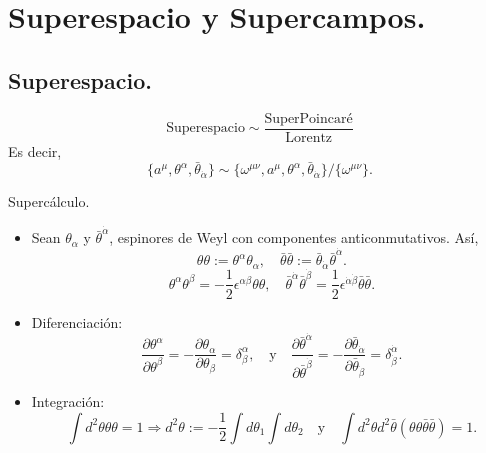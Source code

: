 \documentclass[10pt,a4paper]{beamer}
\begin{document}
\section{Superespacio y Supercampos.}

\subsection{Superespacio.}
\begin{frame}{\subsecname}
  \[
    \text{Superespacio} \sim \frac{\text{SuperPoincaré}}{\text{Lorentz}}
  \]
  Es decir,
  \[\{a^\mu ,
\theta^\alpha, \bar\theta_{\dot\alpha} \}
\sim
    \{\omega^{\mu\nu},a^\mu ,
\theta^\alpha, \bar\theta_{\dot\alpha} \} /\{\omega^{\mu\nu}\}  .
\]

\end{frame}

\begin{frame}{Supercálculo.}
  \begin{itemize}
    \item Sean $\theta_\alpha$ y $\bar\theta^{\dot\alpha}$, espinores de Weyl
      con componentes anticonmutativos. Así,
\[
  \theta\theta := \theta^\alpha\theta _\alpha,\quad
  \bar\theta\bar\theta := \bar\theta_{\dot\alpha}\bar\theta ^{\dot\alpha}.
\]
\[
  \theta^\alpha\theta^\beta = -\frac{1}{2}\epsilon^{\alpha\beta} \theta\theta,\quad
  \bar\theta^{\dot\alpha} \bar\theta^{\dot\beta} =
  \frac{1}{2}\epsilon^{\dot\alpha\dot\beta} \bar\theta\bar\theta.
\]
\item Diferenciación:
\[
\frac{\partial\theta^\alpha}{\partial\theta^\beta} = - \frac{\partial\theta_\alpha}{\partial\theta_\beta}
=
\delta^\alpha_\beta
,\quad \text{y} \quad
\frac{\partial\bar\theta^{\dot\alpha}}{\partial\bar\theta^{\dot\beta}} = -\frac{\partial\bar\theta_{\dot\alpha}}{\partial\bar\theta_{\dot\beta}} =
\delta^{\dot\alpha}_{\dot\beta}.
\]

\item Integración:
\[
  \int d^2\theta \theta\theta = 1 \Rightarrow d^2\theta := -\frac{1}{2}\int
  d\theta_1 \int d\theta_2\quad \text{y} \quad \int d^2\theta d^2\bar\theta
  \left(\theta\theta \bar\theta\bar\theta\right) = 1.
\]
\end{itemize}
\end{frame}
\end{document}
